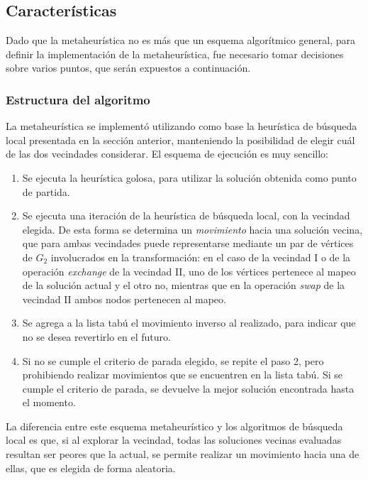 \subsection{Características}
Dado que la metaheurística no es más que un esquema algorítmico general, para
definir la implementación de la metaheurística, fue necesario tomar decisiones
sobre varios puntos, que serán expuestos a continuación.

\subsubsection{Estructura del algoritmo}
La metaheurística se implementó utilizando como base la heurística de búsqueda
local presentada en la sección anterior, manteniendo la posibilidad de
elegir cuál de las dos vecindades considerar. El esquema de ejecución es muy
sencillo:
\begin{enumerate}
    \item Se ejecuta la heurística golosa, para utilizar la solución obtenida
    como punto de partida.
    \item Se ejecuta una iteración de la heurística de búsqueda local, con la
    vecindad elegida. De esta forma se determina un \emph{movimiento} hacia
    una solución vecina, que para ambas vecindades puede representarse
    mediante un par de vértices de $G_2$ involucrados en la transformación: en
    el caso de la vecindad I o de la operación \emph{exchange} de la vecindad
    II, uno de los vértices pertenece al mapeo de la solución actual y el otro
    no, mientras que en la operación \emph{swap} de la vecindad II ambos nodos
    pertenecen al mapeo.
    \item Se agrega a la lista tabú el movimiento inverso al realizado, para
    indicar que no se desea revertirlo en el futuro.
    \item Si no se cumple el criterio de parada elegido, se repite el paso 2,
    pero prohibiendo realizar movimientos que se encuentren en la lista tabú.
    Si se cumple el criterio de parada, se devuelve la mejor solución
    encontrada hasta el momento.
\end{enumerate}

La diferencia entre este esquema metaheurístico y los algoritmos de búsqueda
local es que, si al explorar la vecindad, todas las soluciones vecinas
evaluadas resultan ser peores que la actual, se permite realizar un movimiento
hacia una de ellas, que es elegida de forma aleatoria.

